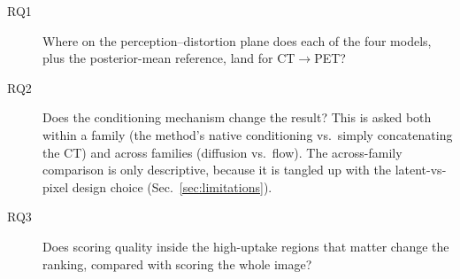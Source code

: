 \documentclass[11pt,a4paper]{article}
\begin{document}
\begin{description}
  \item[RQ1] Where on the perception--distortion plane does each of the four models, plus the posterior-mean reference, land for CT$\to$PET?
  \item[RQ2] Does the conditioning mechanism change the result? This is asked both
  within a family (the method's native conditioning vs.\ simply concatenating the CT) and
  across families (diffusion vs.\ flow). The across-family comparison is only descriptive,
  because it is tangled up with the latent-vs-pixel design choice (Sec.~\ref{sec:limitations}).
  \item[RQ3] Does scoring quality inside the high-uptake regions that matter change the
  ranking, compared with scoring the whole image?
\end{description}
\end{document}
